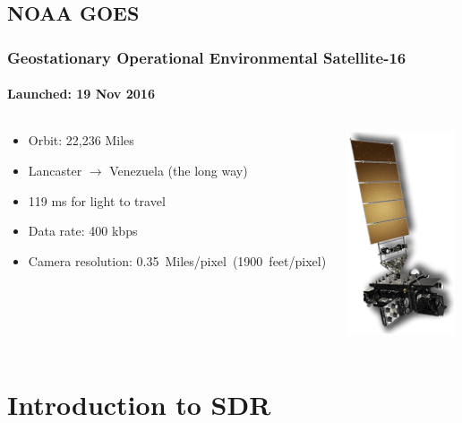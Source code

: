\documentclass[]{beamer}
\begin{document}
\subsection{NOAA GOES}
\begin{frame}
    \frametitle{Geostationary Operational Environmental Satellite-16}
    \framesubtitle{Launched: 19 Nov 2016}
    \begin{columns}[T]
        \begin{column}[T]{6.1cm}
            \begin{itemize}
                \item Orbit: 22,236 Miles
                \item Lancaster $\to$ Venezuela (the long way)
                \item 119 ms for light to travel
                \item Data rate: 400 kbps
                \item Camera resolution: 0.35~Miles/pixel~(1900~feet/pixel)
            \end{itemize}
        \end{column}
        \begin{column}[T]{4cm}
            \includegraphics[height=6cm,keepaspectratio]{images/goes-r-illus.png}
        \end{column}
    \end{columns}
\end{frame}


\section{Introduction to SDR}
\end{document}
